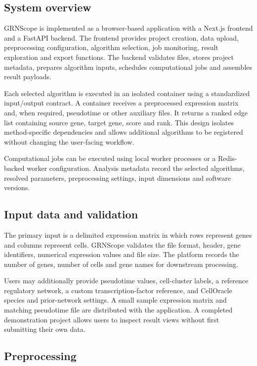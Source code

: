 \documentclass[unnumsec,webpdf,modern,large]{oup-authoring-template}%
\begin{document}
\subsection{System overview}

GRNScope is implemented as a browser-based application with a Next.js frontend and a FastAPI backend. The frontend provides project creation, data upload, preprocessing configuration, algorithm selection, job monitoring, result exploration and export functions. The backend validates files, stores project metadata, prepares algorithm inputs, schedules computational jobs and assembles result payloads.

Each selected algorithm is executed in an isolated container using a standardized input/output contract. A container receives a preprocessed expression matrix and, when required, pseudotime or other auxiliary files. It returns a ranked edge list containing source gene, target gene, score and rank. This design isolates method-specific dependencies and allows additional algorithms to be registered without changing the user-facing workflow.

Computational jobs can be executed using local worker processes or a Redis-backed worker configuration. Analysis metadata record the selected algorithms, resolved parameters, preprocessing settings, input dimensions and software versions.

\subsection{Input data and validation}

The primary input is a delimited expression matrix in which rows represent genes and columns represent cells. GRNScope validates the file format, header, gene identifiers, numerical expression values and file size. The platform records the number of genes, number of cells and gene names for downstream processing.

Users may additionally provide pseudotime values, cell-cluster labels, a reference regulatory network, a custom transcription-factor reference, and CellOracle species and prior-network settings. A small sample expression matrix and matching pseudotime file are distributed with the application. A completed demonstration project allows users to inspect result views without first submitting their own data.

\subsection{Preprocessing}
\end{document}

